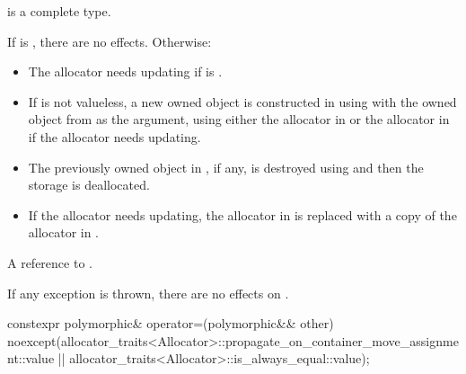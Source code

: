 \begin{itemdescr}
\pnum
\mandates
{} is a complete type.

\pnum
\effects
If  is , there are no effects.
Otherwise:

\begin{itemize}
\item
The allocator needs updating if
is .

\item
If  is not valueless,
a new owned object is constructed in  using
 with
the owned object from  as the argument, using either
the allocator in  or
the allocator in  if the allocator needs updating.

\item
The previously owned object in , if any,
is destroyed using  and
then the storage is deallocated.

\item
If the allocator needs updating,
the allocator in  is replaced with
a copy of the allocator in .
\end{itemize}

\pnum
\returns
A reference to .

\pnum
\remarks
If any exception is thrown, there are no effects on .
\end{itemdescr}

%
\begin{itemdecl}
constexpr polymorphic& operator=(polymorphic&& other)
  noexcept(allocator_traits<Allocator>::propagate_on_container_move_assignment::value ||
           allocator_traits<Allocator>::is_always_equal::value);
\end{itemdecl}

